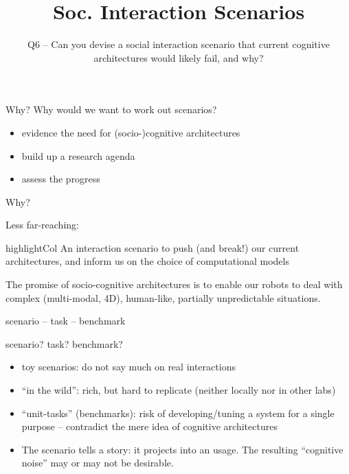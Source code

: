 \documentclass[compress]{beamer}
\title{Soc. Interaction Scenarios}
\subtitle{Q6 -- Can you devise a social interaction scenario that current
cognitive architectures would likely fail, and why?}
\date{}
\author{}
\institute{\texttt{[image: plymouth-logo]}}
\newcommand{\highlight}[1]{%
    \begin{beamercolorbox}[wd=\linewidth,dp=0.7ex]{highlightCol}%
    #1%
    \end{beamercolorbox}%
}%
\begin{document}
\maketitle

\begin{frame}{Why?}
    Why would we want to work out scenarios?

    \begin{itemize}
        \item {\Medium evidence the need} for (socio-)cognitive architectures
        \item build up a research agenda
        \item assess the progress
    \end{itemize}


\end{frame}

\begin{frame}{Why?}

    Less far-reaching:
    \vspace{1em}

    \highlight{\centering An interaction scenario to {\Medium push (and break!)} our current architectures, and
    {\Medium inform} us on the choice of computational models}

\end{frame}

\begin{frame}{}

    The promise of socio-cognitive architectures is to enable our
    robots to {\Medium deal with complex (multi-modal, 4D), human-like, partially unpredictable
    situations}.
    
    \vspace{2em}


\end{frame}


\begin{frame}{scenario -- task -- benchmark}

{\Medium scenario? task? benchmark?}

\begin{itemize}
    \item<2-> {\Medium toy scenarios}: do not say much on real interactions
    \item<3-> {\Medium ``in the wild''}: rich, but hard to replicate (neither
        locally nor in other labs)
    \item<4-> {\Medium ``unit-tasks''} (benchmarks): risk of developing/tuning a system for
        a single purpose -- contradict the mere idea of cognitive architectures
    \item<5-> The scenario {\Medium tells a story}: it projects into an
        usage. The resulting ``cognitive noise'' may or may not be desirable.
\end{itemize}
\end{frame}
\end{document}
